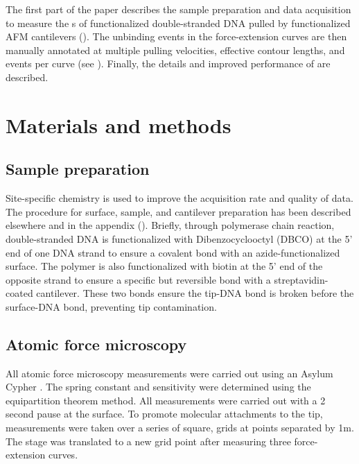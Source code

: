  The first part of the paper describes the sample preparation and data acquisition to measure the \fec{}s of functionalized double-stranded DNA pulled by functionalized AFM cantilevers ().  The unbinding events in the force-extension curves are then manually annotated at multiple pulling velocities, effective contour lengths, and events per curve (see ). Finally, the details and improved performance of \name{} are described. 

\chapter{Materials and methods}

\section{Sample preparation}

Site-specific chemistry is used to improve the acquisition rate and quality of data. The procedure for surface, sample, and cantilever preparation has been described elsewhere\cite{walder_robert_rapid_nodate} and in the appendix (). Briefly, through polymerase chain reaction, double-stranded DNA is functionalized with Dibenzocyclooctyl (DBCO) at the 5' end of one DNA strand to ensure a covalent bond with an azide-functionalized surface. The polymer is also functionalized with biotin at the 5' end of the opposite strand to ensure a specific but reversible bond with a streptavidin-coated cantilever. These two bonds ensure the tip-DNA bond is broken before the surface-DNA bond, preventing tip contamination. 

\section{Atomic force microscopy}

All atomic force microscopy measurements were carried out using an Asylum Cypher . The spring constant and sensitivity were determined using the equipartition theorem method. All measurements were carried out with a 2 second pause at the surface. To promote molecular attachments to the tip, measurements were taken over a series of square,  grids at points separated by 1\textmu{}m. The stage was translated to a new grid point after measuring three force-extension curves. 


